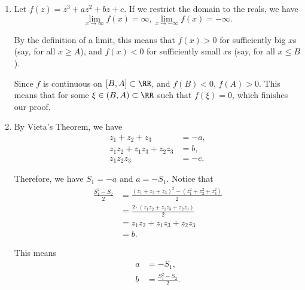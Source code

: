 \Question{\currfilebase}

\begin{enumerate}
    \item Let \(f(z) = z^3 + az^2 + bz + c\). If we restrict the domain to the reals, we have
          \[
              \lim_{x \to \infty} f(x) = \infty, \lim_{x \to -\infty} f(x) = -\infty.
          \]

          By the definition of a limit, this means that \(f(x) > 0\) for sufficiently big \(x\)s (say, for all \(x \geq A\)), and \(f(x) < 0\) for sufficiently small \(x\)s (say, for all \(x \leq B\)).

          Since \(f\) is continuous on \([B, A] \subset \RR\), and \(f(B) < 0\), \(f(A) > 0\). This means that for some \(\xi \in (B, A) \subset \RR\) such that \(f(\xi) = 0\), which finishes our proof.

    \item By Vieta's Theorem, we have
          \begin{align*}
              z_1 + z_2 + z_3             & = -a, \\
              z_1 z_2 + z_1 z_3 + z_2 z_3 & = b,  \\
              z_1 z_2 z_3                 & = -c.
          \end{align*}

          Therefore, we have \(S_1 = -a\) and \(a = -S_1\). Notice that
          \begin{align*}
              \frac{S_1^2 - S_2}{2} & = \frac{(z_1 + z_2 + z_3)^2 - (z_1^2 + z_2^2 + z_3^2)}{2} \\
                                    & = \frac{2 \cdot (z_1 z_2 + z_1 z_3 + z_2 z_3)}{2}         \\
                                    & = z_1 z_2 + z_1 z_3 + z_2 z_3                             \\
                                    & = b.
          \end{align*}

          This means
          \begin{align*}
              a & = - S_1,                 \\
              b & = \frac{S_1^2 - S_2}{2}.
          \end{align*}


\end{enumerate}
